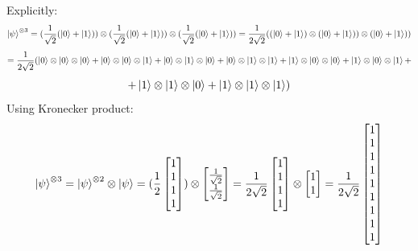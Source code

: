 \documentclass{article}
\begin{document}
\begin{framed}
$$    $$
    Explicitly: 
    $$
    \ket{\psi}^{\otimes3} = (\frac{1}{\sqrt{2}}(\ket{0} + \ket{1})) \otimes (\frac{1}{\sqrt{2}}(\ket{0} + \ket{1})) \otimes (\frac{1}{\sqrt{2}}(\ket{0} + \ket{1})) = \frac{1}{2\sqrt{2}}((\ket{0} + \ket{1}) \otimes (\ket{0} + \ket{1})) \otimes (\ket{0} + \ket{1}))
    $$
    $$
    = \frac{1}{2\sqrt{2}}(\ket{0} \otimes \ket{0} \otimes \ket{0} + \ket{0} \otimes \ket{0} \otimes \ket{1} + \ket{0} \otimes \ket{1} \otimes \ket{0} + \ket{0} \otimes \ket{1} \otimes \ket{1} + \ket{1} \otimes \ket{0} \otimes \ket{0} + \ket{1} \otimes \ket{0} \otimes \ket{1} + 
    $$
    $$
    + \ket{1} \otimes \ket{1} \otimes \ket{0} + \ket{1} \otimes \ket{1} \otimes \ket{1})
    $$
    Using Kronecker product:
    $$
    \ket{\psi}^{\otimes3} = \ket{\psi}^{\otimes2} \otimes \ket{\psi} = (\frac{1}{2}\begin{bmatrix}1 \\ 1\\ 1\\ 1\end{bmatrix}) \otimes \begin{bmatrix} \frac{1}{\sqrt{2}}\\\frac{1}{\sqrt{2}}\end{bmatrix} = \frac{1}{2\sqrt{2}}\begin{bmatrix}1 \\ 1\\ 1\\ 1\end{bmatrix} \otimes \begin{bmatrix}1 \\1 \end{bmatrix} = \frac{1}{2\sqrt{2}}\begin{bmatrix}1 \\ 1\\ 1\\ 1\\ 1\\ 1\\ 1\\ 1\\ 1\end{bmatrix}
    $$
    \medskip
    
    
\end{framed}

\bigskip
\end{document}
